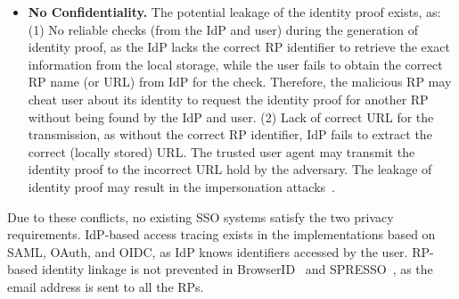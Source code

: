\begin{itemize}
    \item \textbf{No Confidentiality.}
    The potential leakage of the identity proof exists, as:
    (1) No reliable checks (from the IdP and user) during the generation of identity proof, as the IdP lacks the correct RP identifier to retrieve the exact information from the local storage,
     while the user fails to obtain the correct RP name (or URL) from IdP for the check.
     Therefore, the malicious RP may cheat user about its identity to request the identity proof for another RP without being found by the IdP and user.
     (2) Lack of correct URL for the transmission, as without the correct RP identifier, IdP fails to extract the correct (locally stored) URL.
      The trusted user agent may transmit the identity proof to the incorrect URL hold by the adversary.
    The leakage of identity proof may result in the impersonation attacks~\cite{ChenPCTKT14,FettKS16,WangZLG16}.
\end{itemize}

Due to these conflicts, no existing SSO systems satisfy the two privacy requirements.
IdP-based access tracing exists in the implementations based on SAML, OAuth, and OIDC, as IdP knows identifiers accessed by the user.
RP-based identity linkage is not prevented in BrowserID~\cite{BrowserID} and SPRESSO~\cite{SPRESSO}, as the email address is sent to all the RPs.


